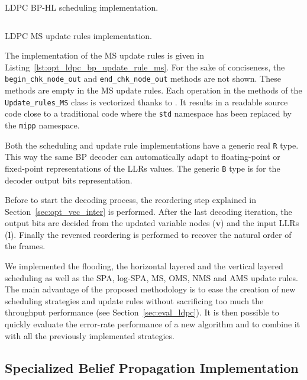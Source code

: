 \begin{listing}[htp]
  \inputminted[frame=lines,linenos]{C++}{\curChapter/src/ldpc/bp_scheduling_hl.cpp}
  \caption{LDPC BP-HL scheduling implementation.}
  \label{lst:opt_ldpc_bp_scheduling_hl}
\end{listing}

\begin{listing}[htp]
  \inputminted[frame=lines,linenos]{C++}{\curChapter/src/ldpc/bp_update_rule_ms.cpp}
  \caption{LDPC MS update rules implementation.}
  \label{lst:opt_ldpc_bp_update_rule_ms}
\end{listing}

The implementation of the MS update rules is given in
Listing~\ref{lst:opt_ldpc_bp_update_rule_ms}. For the sake of conciseness, the
\verb|begin_chk_node_out| and \verb|end_chk_node_out| methods are not shown.
These methods are empty in the MS update rules. Each operation in the methods of
the \verb|Update_rules_MS| class is vectorized thanks to \MIPP. It results in a
readable source code close to a traditional \Cxx code where the \verb|std|
namespace has been replaced by the \verb|mipp| namespace.

Both the scheduling and update rule implementations have a generic real
\verb|R| type. This way the same BP decoder can automatically adapt to
floating-point or fixed-point representations of the LLRs values. The generic
\verb|B| type is for the decoder output bits representation.

Before to start the decoding process, the reordering step explained in
Section~\ref{sec:opt_vec_inter} is performed. After the last decoding
iteration, the output bits are decided from the updated variable nodes
($\bm{v}$) and the input LLRs ($\bm{l}$). Finally the reversed reordering is
performed to recover the natural order of the frames.

We implemented the flooding, the horizontal layered and the vertical layered
scheduling as well as the SPA, log-SPA, MS, OMS, NMS and AMS update rules.
The main advantage of the proposed methodology is to ease the creation of new
scheduling strategies and update rules without sacrificing too much the
throughput performance (see Section~\ref{sec:eval_ldpc}). It is then possible to
quickly evaluate the error-rate performance of a new algorithm and to combine it
with all the previously implemented strategies.

\subsection{Specialized Belief Propagation Implementation}
\label{sec:opt_ldpc_spe_bphlnms}

